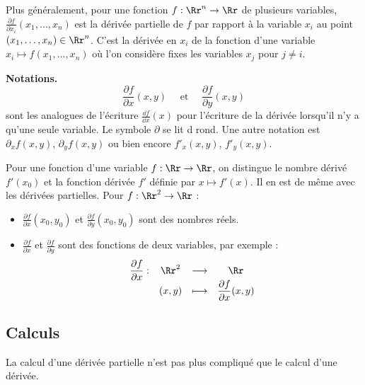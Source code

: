 \documentclass[11pt,class=report,crop=false]{standalone}
\begin{document}
Plus généralement, pour une fonction $f : \Rr^n \to \Rr$ de plusieurs variables,
$\frac{\partial f}{\partial x_i} (x_1,\ldots,x_n)$ est la dérivée partielle de $f$ par rapport à la variable $x_i$ au point $(x_1,\ldots,x_n) \in \Rr^n$.
C'est la dérivée en $x_i$ de la fonction d'une variable $x_i \mapsto f(x_1,\ldots,x_n)$ où l'on considère fixes les variables $x_j$ pour $j \neq i$.

\bigskip

\textbf{Notations.}
$$\frac{\partial f}{\partial x} (x,y) \quad \text{ et } \quad \frac{\partial f}{\partial y} (x,y)$$
sont les analogues de l'écriture $\frac{\dd f}{\dd x}(x)$ pour l'écriture de la dérivée lorsqu'il n'y a qu'une seule variable.
Le symbole \og{}$\partial$\fg{} se lit \og{}d rond\fg{}.
Une autre notation est $\partial_x f(x,y)$, $\partial_y f(x,y)$ ou bien encore $f'_x (x,y)$, $f'_y (x,y)$.




\bigskip

\begin{remarque*}
Pour une fonction d'une variable $f : \Rr \to \Rr$,
on distingue le nombre dérivé $f'(x_0)$ et la fonction dérivée $f'$ définie par $x \mapsto f'(x)$. Il en est de même avec les dérivées partielles. Pour $f : \Rr^2 \to \Rr$ :
\begin{itemize}
  \item $\displaystyle \frac{\partial f}{\partial x} (x_0,y_0)$ et $\displaystyle \frac{\partial f}{\partial y} (x_0,y_0)$
  sont des nombres réels.
  
  \item $\displaystyle \frac{\partial f}{\partial x}$ et $\displaystyle \frac{\partial f}{\partial y}$ sont des fonctions de deux variables, par exemple :
$$\begin{array}{cccc}
 \dfrac{\partial f}{\partial x} : & \Rr^2 & \longrightarrow & \Rr \\
                                 & (x,y) & \longmapsto & \dfrac{\partial f}{\partial x} (x,y)
\end{array}$$
\end{itemize}
\end{remarque*}



\subsection{Calculs}

La calcul d'une dérivée partielle n'est pas plus compliqué que le calcul d'une dérivée.
\end{document}
